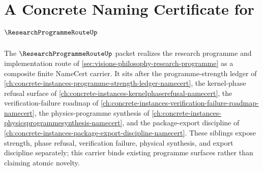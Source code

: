 \chapter{A Concrete Naming Certificate for $\ResearchProgrammeRouteUp$}
\label{ch:concrete-instances-research-programme-route-namecert}

The $\ResearchProgrammeRouteUp$ packet realizes the research programme and implementation route of \autoref{sec:visions-philosophy-research-programme} as a composite finite NameCert carrier. It sits after the programme-strength ledger of \autoref{ch:concrete-instances-programme-strength-ledger-namecert}, the kernel-phase refusal surface of \autoref{ch:concrete-instances-kernelphaserefusal-namecert}, the verification-failure roadmap of \autoref{ch:concrete-instances-verification-failure-roadmap-namecert}, the physics-programme synthesis of \autoref{ch:concrete-instances-physicsprogrammesynthesis-namecert}, and the package-export discipline of \autoref{ch:concrete-instances-package-export-discipline-namecert}. These siblings expose strength, phase refusal, verification failure, physical synthesis, and export discipline separately; this carrier binds existing programme surfaces rather than claiming atomic novelty.

